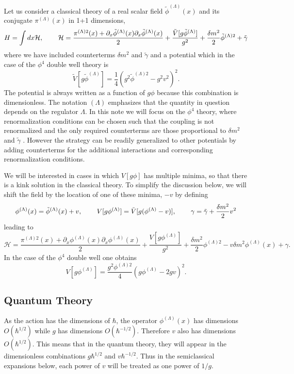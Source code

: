 \def\letter{0}\def\pr{0}\documentclass[a4paper,12pt, epsfig]{article}
\def\hsp{,\hspace{.7cm}}
\renewcommand{\(}{\begin{equation}}
\renewcommand{\)}{end{equation} \vspace{-.05in}\linebreak}
\renewcommand{\=}{\hspace{-.03in}=\hspace{-.02in}}
\renewcommand{\(}{\begin{equation}}
\renewcommand{\)}{\end{equation}}
\renewcommand{\hsp}{,\hspace{.3in}}
\renewcommand{\(}{\begin{equation}}
\renewcommand{\)}{\end{equation}}
\renewcommand{\L}{{(\Lambda)}}
\def\mh{\mathcal{H}}
\newcommand{\beq}{\begin{equation}}
\newcommand{\eeq}{\end{equation}}
\begin{document}
Let us consider a classical theory of a real scalar field $\tilde{\phi}^\L(x)$ and its conjugate $\pi^\L(x)$ in 1+1 dimensions,
\beq
H=\int dx \mh\hsp
\mh=\frac{\pi^{\L 2}(x)+\partial_x \tilde{\phi}^\L (x)\partial_x \tilde{\phi}^\L (x)}{2}+\frac{\tilde{V}[g\tilde{\phi}^\L]}{g^2}+\frac{\delta m^2}{2}\tilde{\phi}^{\L 2}+\tilde{\gamma}
\eeq
where we have included counterterms $\delta m^2$ and $\tilde{\gamma}$ and a potential which in the case of the $\phi^4$ double well theory is  
\beq
\tilde{V}[g\tilde{\phi}^\L]=\frac{1}{4}\left(g^2\tilde{\phi}^{\L 2}-g^2v^2\right)^2.
\eeq
The potential is always written as a function of $g\phi$ because this combination is dimensionless.  The notation $\L$ emphasizes that the quantity in question depends on the regulator $\Lambda$.   In this note we will focus on the $\phi^4$ theory, where renormalization conditions can be chosen such that the coupling is not renormalized and the only required counterterms are those proportional to $\delta m^2$ and $\tilde{\gamma}$ \cite{rebhan}.  However the strategy can be readily generalized to other potentials by adding counterterms for the additional interactions and corresponding renormalization conditions.

We will be interested in cases in which $V[g\phi]$ has multiple minima, so that there is a kink solution in the classical theory.  To simplify the discussion below, we will shift the field by the location of one of these minima, $-v$ by defining
\beq
\phi^\L(x)=\tilde{\phi}^\L(x)+v\hsp
V[g\phi^\L]=\tilde{V}[g(\phi^\L-v)]\hsp
\gamma=\tilde{\gamma}+\frac{\delta m^2}{2}v^2 \label{shift}
\eeq
leading to
\beq
\mh=\frac{\pi^{\L 2}(x)+\partial_x {\phi}^\L (x)\partial_x {\phi}^\L (x)}{2}+\frac{{V}[g{\phi}^\L]}{g^2}+\frac{\delta m^2}{2}{\phi}^{\L 2}-v\delta m^2\phi^\L(x)+{\gamma}. \label{h}
\eeq
In the case of the $\phi^4$ double well one obtains
\beq
{V}[g{\phi}^\L]=\frac{g^2\phi^{\L 2}}{4}\left(g\phi^{\L}-2gv\right)^2.
\eeq


\subsection{Quantum Theory} \label{qsez}

As the action has the dimensions of $\hbar$, the operator $\phi^\L(x)$ has dimensions $O(\hbar^{1/2})$ while $g$ has dimensions  $O(\hbar^{-1/2})$.  Therefore $v$ also has dimensions $O(\hbar^{1/2})$.  This means that in the quantum theory, they will appear in the dimensionless combinations $g\hbar^{1/2}$ and $v\hbar^{-1/2}$.  Thus in the semiclassical expansions below, each power of $v$ will be treated as one power of $1/g$.
\end{document}

